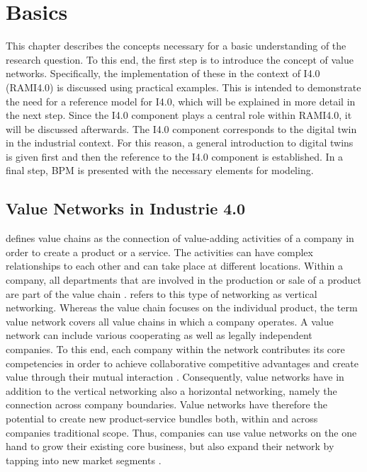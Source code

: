 \chapter{Basics}
This chapter describes the concepts necessary for a basic understanding of the research question. To this end, the first step is to introduce the concept of value networks. Specifically, the implementation of these in the context of \ac{I4.0} (\ac{RAMI4.0}) is discussed using practical examples. This is intended to demonstrate the need for a reference model for \ac{I4.0}, which will be explained in more detail in the next step. Since the \ac{I4.0} component plays a central role within \ac{RAMI4.0}, it will be discussed afterwards. The \ac{I4.0} component corresponds to the digital twin in the industrial context. For this reason, a general introduction to digital twins is given first and then the reference to the \ac{I4.0} component is established. In a final step, \ac{BPM} is presented with the necessary elements for modeling.

\section{Value Networks in Industrie 4.0}
\citet[p. 6]{Sturgeon2001HowNetworks} defines value chains as the connection of value-adding activities of a company in order to create a product or a service. The activities can have complex relationships to each other and can take place at different locations. Within a company, all departments that are involved in the production or sale of a product are part of the value chain \cite[p. 10]{Sturgeon2001HowNetworks}. \citeauthor{Sturgeon2001HowNetworks} refers to this type of networking as vertical networking. Whereas the value chain focuses on the individual product, the term value network covers all value chains in which a company operates. A value network can include various cooperating as well as legally independent companies. To this end, each company within the network contributes its core competencies in order to achieve collaborative competitive advantages and create value through their mutual interaction \cite[p. 3]{Bach2010GeschaftsmodelleGrundlagen}. Consequently, value networks have in addition to the vertical networking also a horizontal networking, namely the connection across company boundaries. Value networks have therefore the potential to create new product-service bundles both, within and across companies traditional scope. Thus, companies can use value networks on the one hand to grow their existing core business, but also expand their network by tapping into new market segments \cite[p. 22]{Acatech2013Recommendations4.0}.

